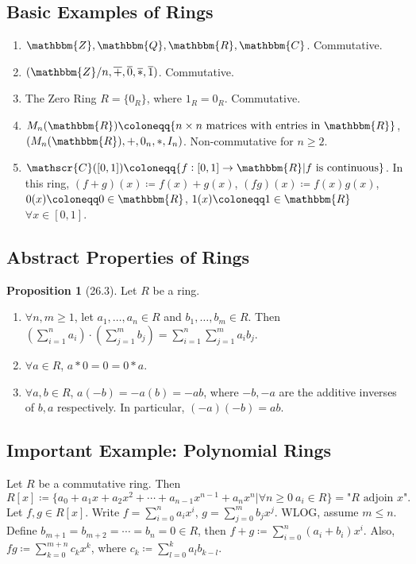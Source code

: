 \documentclass{article}
\newcommand{\Z}{\mathbbm{Z}}
\newcommand{\Q}{\mathbbm{Q}}
\newcommand{\R}{\mathbbm{R}}
\newcommand{\C}{\mathbbm{C}}
\newcommand{\coleq}{\coloneqq}
\newcommand{\script}[1]{\mathscr{#1}}
\newcommand{\func}[3]{#1: #2 \to #3}
\theoremstyle{definition}
\newtheorem*{prop}{Proposition}
\theoremstyle{remark}
\begin{document}
{        \subsection*{Basic Examples of Rings}{
            \begin{enumerate}
                \item $\Z,\Q,\R,\C$. Commutative.
                \item $(\Z/n,\overline{+},\overline{0},\overline{*},\overline{1})$. Commutative.
                \item The Zero Ring $R=\{0_R\}$, where $1_R=0_R$. Commutative.
                \item $M_n(\R)\coleq \{n\times n\text{ matrices with entries in }\R\}$, $(M_n(\R),+,0_n,*,I_n)$. Non-commutative for $n\geq 2$.
                \item $\script{C}([0,1])\coleq \{\func{f}{[0,1]}{\R}|f\text{ is continuous}\}$. In this ring, $(f+g)(x)\coleq f(x)+g(x)$, $(fg)(x)\coleq f(x)g(x)$, $0(x)\coleq 0 \in \R$, $1(x) \coleq 1 \in \R$ $\forall x \in [0,1]$.
            \end{enumerate}
        }
        \subsection*{Abstract Properties of Rings}{
            \begin{prop}[26.3]
                Let $R$ be a ring.
                \begin{enumerate}
                    \item $\forall n,m \geq 1$, let $a_1,\ldots,a_n \in R$ and $b_1,\ldots, b_m \in R$. Then $\left(\sum_{i=1}^n a_i\right)\cdot\left(\sum_{j=1}^m b_j\right)=\sum_{i=1}^n\sum_{j=1}^m a_i b_j$.
                    \item $\forall a\in R$, $a*0=0=0*a$.
                    \item $\forall a,b\in R$, $a(-b)=-a(b)=-ab$, where $-b,-a$ are the additive inverses of $b,a$ respectively. In particular, $(-a)(-b)=ab$.
                \end{enumerate}
            \end{prop}
        }
        \subsection*{Important Example: Polynomial Rings}{
            Let $R$ be a commutative ring. Then
            \[R[x]\coleq\{a_0+a_1x+a_2x^2+\cdots+a_{n-1}x^{n-1}+a_nx^n|\forall n\geq 0 \ a_i \in R\}=\text{"}R\text{ adjoin }x\text{"}.\]
        Let $f,g\in R[x]$. Write $f=\sum_{i=0}^n a_i x^i$, $g=\sum_{j=0}^m b_j x^j$. WLOG, assume $m\leq n$. Define $b_{m+1}=b_{m+2}=\cdots=b_n=0 \in R$, then $f+g\coleq \sum_{i=0}^n (a_i+b_i)x^i$. Also, $fg \coleq \sum_{k=0}^{m+n} c_k x^k$, where $c_k\coleq \sum_{l=0}^k a_lb_{k-l}$. 
        }
    }
\end{document}

